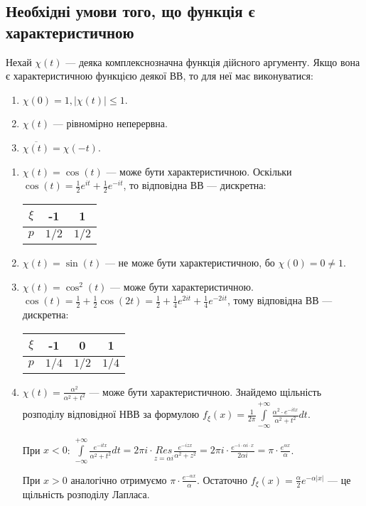 \subsection{Необхідні умови того, що функція є характеристичною}
Нехай $\chi(t)$ --- деяка комплекснозначна функція дійсного аргументу.
Якщо вона є характеристичною функцією деякої ВВ, то для неї має виконуватися:
\begin{enumerate}
    \item $\chi(0) = 1, \left| \chi(t)\right| \leq 1$.
    \item $\chi(t)$ --- рівномірно неперервна.
    \item $\overline{\chi(t)} = \chi(-t)$.
\end{enumerate}
\begin{example}
    \begin{enumerate}
        \item $\chi(t) = \cos(t)$ --- може бути характеристичною.
        Оскільки $\cos(t) = \frac{1}{2}e^{it} + \frac{1}{2}e^{-it}$, то відповідна ВВ --- дискретна: 
        \begin{tabular}{c|c|c}
            $\xi$ & -1 & 1 \\
            \hline
            $p$ & $1/2$ & $1/2$
        \end{tabular}
        \item $\chi(t) = \sin(t)$ --- не може бути характеристичною, бо $\chi(0) = 0 \neq 1$.
        \item $\chi(t) = \cos^2(t)$ --- може бути характеристичною.
        $\cos(t) = \frac{1}{2} + \frac{1}{2}\cos(2t) = \frac{1}{2} + \frac{1}{4}e^{2it} + \frac{1}{4}e^{-2it}$, тому
        відповідна ВВ --- дискретна:
        \begin{tabular}{c|c|c|c}
            $\xi$ & -1 & 0 & 1 \\
            \hline
            $p$ & $1/4$ & $1/2$ & $1/4$
        \end{tabular}
        \item $\chi(t) = \frac{\alpha^2}{\alpha^2 + t^2}$ --- може бути характеристичною. 
        Знайдемо щільність розподілу відповідної НВВ за формулою $f_\xi(x) = \frac{1}{2\pi}\int\limits_{-\infty}^{+\infty} \frac{\alpha^2 \cdot e^{-itx}}{\alpha^2 + t^2} dt$.

        При $x<0$: $\int\limits_{-\infty}^{+\infty} \frac{e^{-itx}}{\alpha^2 + t^2} dt = 2\pi i \cdot \underset{z=\alpha i}{{Res}} \frac{e^{-izx}}{\alpha^2 + z^2} = 2\pi i \cdot \frac{e^{-i\cdot \alpha i\cdot x}}{2\alpha i} = \pi \cdot \frac{e^{\alpha x}}{\alpha}$.

        При $x>0$ аналогічно отримуємо $\pi \cdot \frac{e^{-\alpha x}}{\alpha}$.
        Остаточно $f_\xi(x) = \frac{\alpha}{2}e^{-\alpha |x|}$ --- це щільність розподілу Лапласа.
    \end{enumerate}
\end{example}


